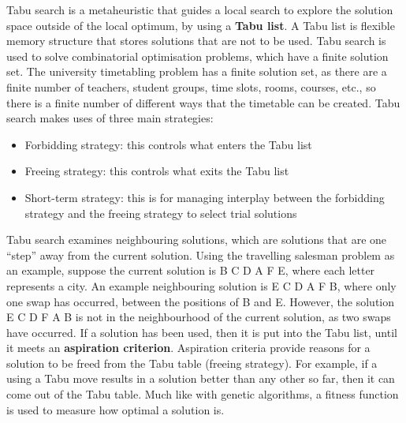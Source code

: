 \documentclass[a4paper, 12pt]{report}
\begin{document}
Tabu search is a metaheuristic that guides a local search to explore the
solution space outside of the local optimum, by using a \textbf{Tabu list}.
A Tabu list is flexible memory structure that stores solutions that are not to
be used.
Tabu search is used to solve combinatorial optimisation problems, which have a
finite solution set.
The university timetabling problem has a finite solution set, as there are a
finite number of teachers, student groups, time slots, rooms, courses, etc., so
there is a finite number of different ways that the timetable can be created.
Tabu search makes uses of three main strategies:
\begin{itemize}
	\item Forbidding strategy: this controls what enters the Tabu list
	\item Freeing strategy: this controls what exits the Tabu list
	\item Short-term strategy: this is for managing interplay between the
		forbidding strategy and the freeing strategy to select trial solutions
\end{itemize}
Tabu search examines neighbouring solutions, which are solutions that are one
“step” away from the current solution.
Using the travelling salesman problem as an example, suppose the current
solution is B C D A F E, where each letter represents a city.
An example neighbouring solution is E C D A F B, where only one swap has
occurred, between the positions of B and E.
However, the solution E C D F A B is not in the neighbourhood of the current
solution, as two swaps have occurred.
If a solution has been used, then it is put into the Tabu list, until it meets
an \textbf{aspiration criterion}.
Aspiration criteria provide reasons for a solution to be freed from the Tabu
table (freeing strategy).
For example, if a using a Tabu move results in a solution better than any other
so far, then it can come out of the Tabu table. Much like with genetic
algorithms, a fitness function is used to measure how optimal a solution is.
\end{document}
